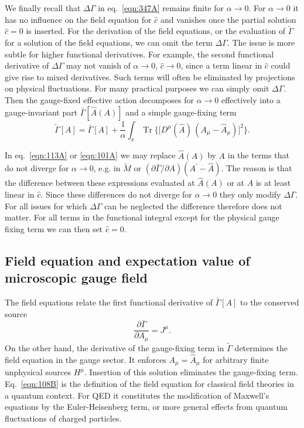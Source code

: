 \documentclass[twocolumn,aps,prd,amsmath,amssymb,preprintnumbers,longbibliography]{revtex4-1}
\numberwithin{equation}{section}
\DeclareMathOperator{\Tr}{Tr}
\begin{document}
We finally recall that $\Delta \Gamma$ in eq.~\eqref{eqn:347A} remains finite for $\alpha \to 0$. For $\alpha \to 0$ it has no influence on the field equation for $\hat{c}$ and vanishes once the partial solution $\hat{c} = 0$ is inserted. For the derivation of the field equations, or the evaluation of $\tilde{\Gamma}$ for a solution of the field equations, we can omit the term $\Delta\Gamma$. The issue is more subtle for higher functional derivatives. For example, the second functional derivative of $\Delta\Gamma$ may not vanish of $\alpha\to 0$, $\hat{c}\to 0$, since a term linear in $\hat{c}$ could give rise to mixed derivatives. Such terms will often be eliminated by projections on physical fluctuations. For many practical purposes we can simply omit $\Delta\Gamma$. Then the gauge-fixed effective action decomposes for $\alpha \to 0$ effectively into a gauge-invariant part $\bar\Gamma[\hat{A}(A)]$ and a simple gauge-fixing term
\begin{equation}\label{eqn:108A}
	\tilde\Gamma[A]
	= \bar\Gamma[A] + \frac{1}{\alpha} \int_x \Tr\bigl\{\bigl[D^\mu(\hat{A}) \, (A_\mu - \hat{A}_\mu)\bigr]^2\bigr\}.
\end{equation}

In eq.~\eqref{eqn:113A} or \eqref{eqn:101A} we may replace $\hat{A}(A)$ by $A$ in the terms that do not diverge for $\alpha\to 0$, e.g. in $\tilde{M}$ or $(\partial\bar{\Gamma}/\partial A)(A^{\prime}-\hat{A})$. The reason is that the difference between these expressions evaluated at $\hat{A}(A)$ or at $A$ is at least linear in $\hat{c}$. Since these differences do not diverge for $\alpha\to 0$ they only modify $\Delta\Gamma$. For all issues for which $\Delta\Gamma$ can be neglected the difference therefore does not matter. For all terms in the functional integral except for the physical gauge fixing term we can then set $\hat{c}=0$.


\subsection{Field equation and expectation value of microscopic gauge field}

The field equations relate the first functional derivative of $\bar\Gamma[A]$ to the conserved source
\begin{equation}\label{eqn:108B}
	\frac{\partial \bar\Gamma}{\partial A_\mu}
	= J^\mu.
\end{equation}
On the other hand, the derivative of the gauge-fixing term in $\tilde\Gamma$ determines the field equation in the gauge sector. It enforces $A_\mu = \hat{A}_\mu$ for arbitrary finite unphysical sources $H^\mu$. Insertion of this solution eliminates the gauge-fixing term. Eq.~\eqref{eqn:108B} is the definition of the field equation for classical field theories in a quantum context. For QED it constitutes the modification of Maxwell's equations by the Euler-Heisenberg term, or more general effects from quantum fluctuations of charged particles.
\end{document}
